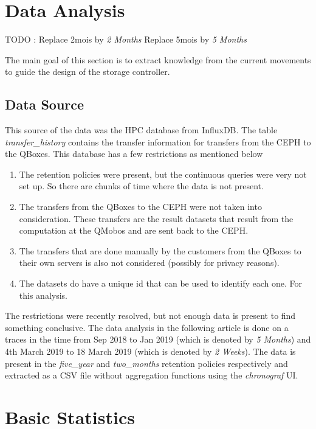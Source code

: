 \section{Data Analysis}

TODO : Replace 2mois by \textit{2 Months}
       Replace 5mois by \textit{5 Months}

The main goal of this section is to extract knowledge from the current movements to guide the design of the storage controller. 

\subsection{Data Source}

This source of the data was the HPC database from InfluxDB. The table \textit{transfer\_history} contains the transfer information for transfers from the CEPH to the QBoxes. This database has a few restrictions as mentioned below

\begin{enumerate}
    \item The retention policies were present, but the continuous queries were very not set up. So there are chunks of time where the data is not present.
    \item The transfers from the QBoxes to the CEPH were not taken into consideration. These transfers are the result datasets that result from the computation at the QMobos and are sent back to the CEPH.
    \item The transfers that are done manually by the customers from the QBoxes to their own servers is also not considered (possibly for privacy reasons).
    \item The datasets do have a unique id that can be used to identify each one. For this analysis. 
\end{enumerate}

The restrictions were recently resolved, but not enough data is present to find something conclusive. The data analysis in the following article is done on a traces in the time from Sep 2018 to Jan 2019 (which is denoted by \textit{5 Months}) and 4th March 2019 to 18 March 2019 (which is denoted by \textit{2 Weeks}). The data is present in the \textit{five\_year} and \textit{two\_months} retention policies respectively and extracted as a CSV file without aggregation functions using the \textit{chronograf} UI.

\section{Basic Statistics}

